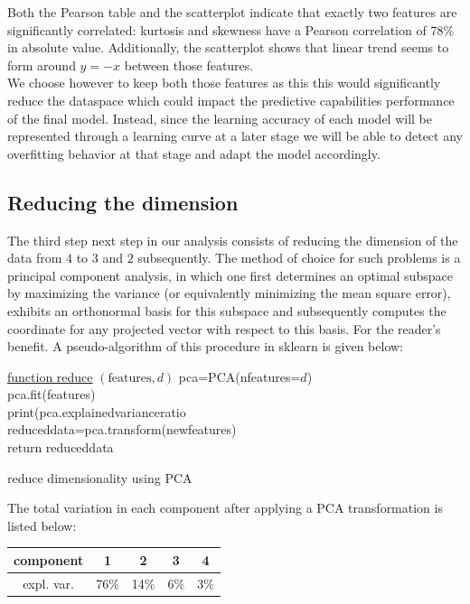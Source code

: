 \documentclass[14pt]{article}
\theoremstyle{plain}
\theoremstyle{definition}
\newcommand{\un}{\textunderscore}
\begin{document}
 Both the Pearson table and the scatterplot indicate that exactly two features are significantly correlated: kurtosis and skewness have a Pearson correlation of 78\% in absolute value. Additionally, the scatterplot shows that linear trend seems to form around $y=-x$ between those features.\\ 
 We choose however to keep both those features as this this would significantly reduce the dataspace which could impact the predictive capabilities performance of the final model. Instead, since the learning accuracy of each model will be represented through a learning curve at a later stage we will be able to detect any overfitting behavior at that stage and adapt the model accordingly. 

\subsection{Reducing the dimension} The third step next step in our analysis consists of reducing the dimension of the data from $4$ to $3$ and $2$ subsequently. The method of choice for such problems is a principal component analysis, in which one first determines an optimal subspace by maximizing the variance (or equivalently minimizing the mean square error), exhibits an orthonormal basis for this subspace and subsequently computes the coordinate for any projected vector with respect to this basis. For the reader's benefit. A pseudo-algorithm of this procedure in sklearn is given below: 
\newpage 
\begin{algorithm}\label{PCAalg}

    \underline{function reduce} $(\textrm{features}, d)$\;
    pca=PCA(n\textunderscore features=$d$) \\
  	pca.fit(features)\\
    print(pca.explained\textunderscore variance\textunderscore ratio\textunderscore	\\
   reduced\textunderscore data=pca.transform(new\textunderscore features)\\
   return reduced\un data      
   \caption{reduce dimensionality using PCA }
\end{algorithm}
The total variation in each component after applying a PCA transformation is listed below:\\
\begin{center}
\begin{tabular}{|c|c|c|c|c|}
	\hline
	component & 1 & 2 & 3& 4\\
	\hline
	expl. var.& 76\%&  14\% & 6\% & 3\%\\
	 \hline
\end{tabular}
\end{center}
    
\end{document}
